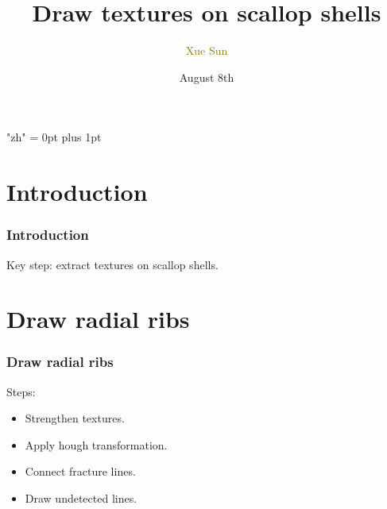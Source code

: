 \documentclass[notheorems,mathserif,table,compress]{beamer}  %
\begin{document}
\XeTeXlinebreaklocale "zh"         %
\XeTeXlinebreakskip = 0pt plus 1pt %
\begin{comment}
\AtBeginSection[]{                              %
  \frame<handout:0>{
    \frametitle{Content}\small
    \tableofcontents[current,currentsubsection]
  }
}
\AtBeginSubsection[]                            %
{
  \frame<handout:0>                             %
  {
    \frametitle{下一节内容}\small
    \tableofcontents[current,currentsubsection] %
  }
}
\end{comment}
\title[]{Draw textures on scallop shells}
\author[Xue Sun]{\textcolor{olive}{Xue Sun}}
\date{August 8th}
\frame{ \titlepage }

\section{Introduction}
\begin{frame}
  \frametitle{Introduction}
  Key step: extract textures on scallop shells. 
\end{frame}
\section{Draw radial ribs}
\begin{frame}
  \frametitle{Draw radial ribs}
  Steps:
  \begin{itemize}
  \item Strengthen textures.
  \item Apply hough transformation.
  \item Connect fracture lines.
  \item Draw undetected lines.
  \end{itemize}
\end{frame}
\end{document}
